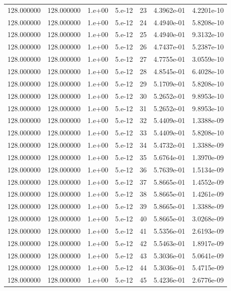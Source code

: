 \begin{table}[htbp]
\begin{tabular}{rrrrrrr}
128.000000 & 128.000000 & 1.e+00 & 5.e-12 & 23 & 4.3962e-01 & 4.2201e-10 \\
128.000000 & 128.000000 & 1.e+00 & 5.e-12 & 24 & 4.4940e-01 & 5.8208e-10 \\
128.000000 & 128.000000 & 1.e+00 & 5.e-12 & 25 & 4.4940e-01 & 9.3132e-10 \\
128.000000 & 128.000000 & 1.e+00 & 5.e-12 & 26 & 4.7437e-01 & 5.2387e-10 \\
128.000000 & 128.000000 & 1.e+00 & 5.e-12 & 27 & 4.7755e-01 & 3.0559e-10 \\
128.000000 & 128.000000 & 1.e+00 & 5.e-12 & 28 & 4.8545e-01 & 6.4028e-10 \\
128.000000 & 128.000000 & 1.e+00 & 5.e-12 & 29 & 5.1709e-01 & 5.8208e-10 \\
128.000000 & 128.000000 & 1.e+00 & 5.e-12 & 30 & 5.2652e-01 & 9.8953e-10 \\
128.000000 & 128.000000 & 1.e+00 & 5.e-12 & 31 & 5.2652e-01 & 9.8953e-10 \\
128.000000 & 128.000000 & 1.e+00 & 5.e-12 & 32 & 5.4409e-01 & 1.3388e-09 \\
128.000000 & 128.000000 & 1.e+00 & 5.e-12 & 33 & 5.4409e-01 & 5.8208e-10 \\
128.000000 & 128.000000 & 1.e+00 & 5.e-12 & 34 & 5.4732e-01 & 1.3388e-09 \\
128.000000 & 128.000000 & 1.e+00 & 5.e-12 & 35 & 5.6764e-01 & 1.3970e-09 \\
128.000000 & 128.000000 & 1.e+00 & 5.e-12 & 36 & 5.7639e-01 & 1.5134e-09 \\
128.000000 & 128.000000 & 1.e+00 & 5.e-12 & 37 & 5.8665e-01 & 1.4552e-09 \\
128.000000 & 128.000000 & 1.e+00 & 5.e-12 & 38 & 5.8665e-01 & 1.4261e-09 \\
128.000000 & 128.000000 & 1.e+00 & 5.e-12 & 39 & 5.8665e-01 & 1.3388e-09 \\
128.000000 & 128.000000 & 1.e+00 & 5.e-12 & 40 & 5.8665e-01 & 3.0268e-09 \\
128.000000 & 128.000000 & 1.e+00 & 5.e-12 & 41 & 5.5356e-01 & 2.6193e-09 \\
128.000000 & 128.000000 & 1.e+00 & 5.e-12 & 42 & 5.5463e-01 & 1.8917e-09 \\
128.000000 & 128.000000 & 1.e+00 & 5.e-12 & 43 & 5.3036e-01 & 5.0641e-09 \\
128.000000 & 128.000000 & 1.e+00 & 5.e-12 & 44 & 5.3036e-01 & 5.4715e-09 \\
128.000000 & 128.000000 & 1.e+00 & 5.e-12 & 45 & 5.4236e-01 & 2.6776e-09 \\

\end{tabular}
\end{table}
